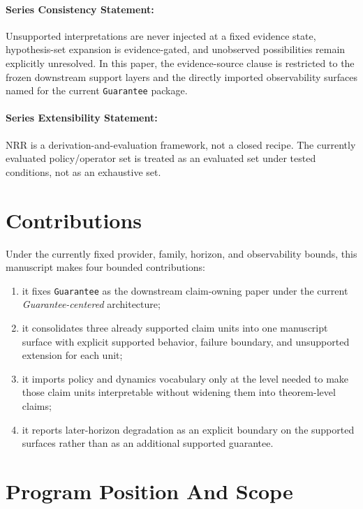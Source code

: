 \documentclass[11pt]{article}
\begin{document}
\paragraph{Series Consistency Statement:}
Unsupported interpretations are never injected at a fixed evidence state,
hypothesis-set expansion is evidence-gated, and unobserved possibilities remain
explicitly unresolved. In this paper, the evidence-source clause is restricted to
the frozen downstream support layers and the directly imported observability
surfaces named for the current \texttt{Guarantee} package.

\paragraph{Series Extensibility Statement:}
NRR is a derivation-and-evaluation framework, not a closed recipe. The currently
evaluated policy/operator set is treated as an evaluated set under tested
conditions, not as an exhaustive set.

\section{Contributions}

Under the currently fixed provider, family, horizon, and observability bounds,
this manuscript makes four bounded contributions:

\begin{enumerate}
\item it fixes \texttt{Guarantee} as the downstream claim-owning paper under the
current \textit{Guarantee-centered} architecture;
\item it consolidates three already supported claim units into one manuscript
surface with explicit supported behavior, failure boundary, and unsupported
extension for each unit;
\item it imports policy and dynamics vocabulary only at the level needed to make
those claim units interpretable without widening them into theorem-level claims;
\item it reports later-horizon degradation as an explicit boundary on the
supported surfaces rather than as an additional supported guarantee.
\end{enumerate}

\section{Program Position And Scope}
\end{document}
